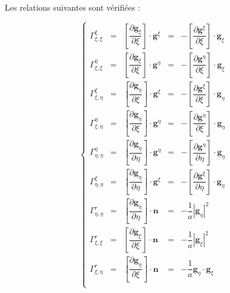 \begin{proposition}
Les relations suivantes sont vérifiées :

\begin{equation}
\left\lbrace
\begin{array}{rcccl}
\Gamma_{\xi,\xi}^{\xi} & = & \left[ \dfrac{\partial \mathbf{g}_{\xi}}{\partial \xi} \right] \cdot \mathbf{g}^{\xi} & = & - \left[ \dfrac{\partial \mathbf{g}^{\xi}}{\partial \xi} \right] \cdot \mathbf{g}_ {\xi}\\

\Gamma_{\xi,\xi}^{\eta} & = & \left[ \dfrac{\partial \mathbf{g}_{\xi}}{\partial \xi} \right] \cdot \mathbf{g}^{\eta} & = & - \left[ \dfrac{\partial \mathbf{g}^{\eta}}{\partial \xi} \right] \cdot \mathbf{g}_ {\xi}\\

\Gamma_{\xi,\eta}^{\xi} & = & \left[ \dfrac{\partial \mathbf{g}_{\eta}}{\partial \xi} \right] \cdot \mathbf{g}^{\xi} & = & - \left[ \dfrac{\partial \mathbf{g}^{\xi}}{\partial \xi} \right] \cdot \mathbf{g}_ {\eta}\\

\Gamma_{\xi,\eta}^{\eta} & = & \left[ \dfrac{\partial \mathbf{g}_{\eta}}{\partial \xi} \right] \cdot \mathbf{g}^{\eta} & = & - \left[ \dfrac{\partial \mathbf{g}^{\eta}}{\partial \xi} \right] \cdot \mathbf{g}_ {\eta}\\

\Gamma_{\eta,\eta}^{\eta} & = & \left[ \dfrac{\partial \mathbf{g}_{\eta}}{\partial \eta} \right] \cdot \mathbf{g}^{\eta} & = & - \left[ \dfrac{\partial \mathbf{g}^{\eta}}{\partial \eta} \right] \cdot \mathbf{g}_ {\eta}\\

\Gamma_{\eta,\eta}^{\xi} & = & \left[ \dfrac{\partial \mathbf{g}_{\eta}}{\partial \eta} \right] \cdot \mathbf{g}^{\xi} & = & - \left[ \dfrac{\partial \mathbf{g}^{\xi}}{\partial \eta} \right] \cdot \mathbf{g}_ {\eta}\\

\Gamma_{\eta,\eta}^{r} & = & \left[ \dfrac{\partial \mathbf{g}_{\eta}}{\partial \eta} \right] \cdot \mathbf{n} & = & - \dfrac{1}{a}|\mathbf{g}_{\eta}|^2\\

\Gamma_{\xi,\xi}^{r} & = & \left[ \dfrac{\partial \mathbf{g}_{\xi}}{\partial \xi} \right] \cdot \mathbf{n} & = & - \dfrac{1}{a}|\mathbf{g}_{\xi}|^2\\

\Gamma_{\xi,\eta}^r & = & \left[ \dfrac{\partial \mathbf{g}_{\eta}}{\partial \xi} \right] \cdot \mathbf{n} & = & - \dfrac{1}{a} \mathbf{g}_{\eta} \cdot \mathbf{g}_{\xi} \\

\end{array}
\right.
\end{equation}
\end{proposition}

